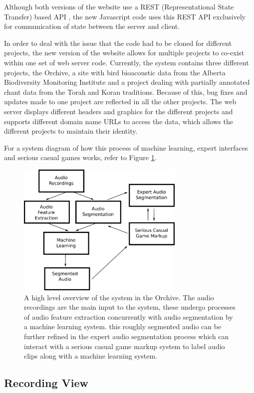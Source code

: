 \documentclass[12pt,oneside]{book}
\begin{document}
Although both versions of the website use a REST (Representational
State Transfer) based API \cite{fieldingphd}, the new Javascript code
uses this REST API exclusively for communication of state between the
server and client.

In order to deal with the issue that the code had to be cloned for
different projects, the new version of the website allows for multiple
projects to co-exist within one set of web server code.  Currently, the
system contains three different projects, the Orchive, a site with
bird bioacoustic data from the Alberta Biodiversity Monitoring
Institute and a project dealing with partially annotated chant data
from the Torah and Koran traditions.  Because of this, bug fixes and
updates made to one project are reflected in all the other projects.
The web server displays different headers and graphics for the
different projects and supports different domain name URLs to access
the data, which allows the different projects to maintain their
identity.

For a system diagram of how this process of machine learning, expert
interfaces and serious casual games works, refer to Figure
\ref{fig:systemDiagram}.

\begin{figure}
\centering
\includegraphics[width=80mm]{figures/systemDiagram}
\caption{A high level overview of the system in the Orchive.  The
  audio recordings are the main input to the system, these undergo
  processes of audio feature extraction concurrently with audio
  segmentation by a machine learning system.  this roughly segmented
  audio can be further refined in the expert audio segmentation
  process which can interact with a serious casual game markup system
  to label audio clips along with a machine learning system.}
\label{fig:systemDiagram} 
\end{figure} 


\subsection{Recording View}
\end{document}
